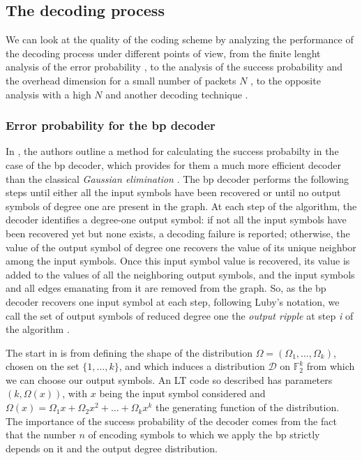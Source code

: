 \subsection{The decoding process}
We can look at the quality of the coding scheme by analyzing the performance of the decoding process under different points of view, from the finite lenght analysis of the error probability \cite{Karp2004}, to the analysis of the success probability and the overhead dimension for a small number of packets $N$ \cite{Hyytia2007}, to the opposite analysis with a high $N$ and another decoding technique \cite{Lu}.

\subsubsection{Error probability for the \gls{bp} decoder}
In \cite{Karp2004}, the authors outline a method for calculating the success probabilty in the case of the \gls{bp} decoder, which provides for them a much more efficient decoder than the classical \textit{Gaussian elimination} \cite{Shokrollahi2006}. The \gls{bp} decoder performs the following steps until either all the input symbols have been recovered or until no output symbols of degree one are present in the graph. At each step of the algorithm, the decoder identifies a degree-one output symbol: if not all the input symbols have been recovered yet but none exists, a decoding failure is reported; otherwise, the value of the output symbol of degree one recovers the value of its unique neighbor among the input symbols. Once this input symbol value is recovered, its value is added to the values of all the neighboring output symbols, and the input symbols and all edges emanating from it are removed from the graph. So, as the \gls{bp} decoder recovers one input symbol at each step, following Luby’s notation, we call the set of output symbols of reduced degree one the \textit{output ripple} at step \textit{i} of the algorithm \cite{Shokrollahi2006}.

The start in \cite{Karp2004} is from defining the shape of the distribution $\Omega = (\Omega_1,\dots,\Omega_k)$, chosen on the set $\{1,\dots,k\}$, and which induces a distribution $\mathcal{D}$ on $\mathbb{F}_2^k$ from which we can choose our output symbols. An LT code so described has parameters $(k,\Omega(x))$, with $x$ being the input symbol considered and $\Omega(x) = \Omega_1x+\Omega_2x^2+\dots+\Omega_kx^k$ the generating function of the distribution. The importance of the success probability of the decoder comes from the fact that the number $n$ of encoding symbols to which we apply the \gls{bp} strictly depends on it and the output degree distribution.

